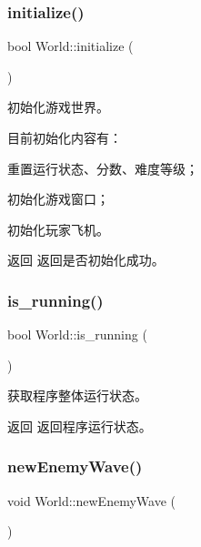 \subsubsection{\texorpdfstring{initialize()}{initialize()}}
{\footnotesize\ttfamily bool World\+::initialize (\begin{DoxyParamCaption}{ }\end{DoxyParamCaption})}



初始化游戏世界。 

目前初始化内容有：
\begin{DoxyEnumerate}
\item 重置运行状态、分数、难度等级；
\item 初始化游戏窗口；
\item 初始化玩家飞机。 
\end{DoxyEnumerate}

\begin{DoxyReturn}{返回}
返回是否初始化成功。 
\end{DoxyReturn}
\mbox{\label{class_world_ad15782e0eaf62c5ab4fcd3620e2c866a}} 
\subsubsection{\texorpdfstring{is\+\_\+running()}{is\_running()}}
{\footnotesize\ttfamily bool World\+::is\+\_\+running (\begin{DoxyParamCaption}{ }\end{DoxyParamCaption})}



获取程序整体运行状态。 

\begin{DoxyReturn}{返回}
返回程序运行状态。 
\end{DoxyReturn}
\mbox{\label{class_world_a9957df94d0d75429c23c7d70c2db282e}} 
\subsubsection{\texorpdfstring{new\+Enemy\+Wave()}{newEnemyWave()}}
{\footnotesize\ttfamily void World\+::new\+Enemy\+Wave (\begin{DoxyParamCaption}{ }\end{DoxyParamCaption})\hspace{0.3cm}{\ttfamily [private]}}




